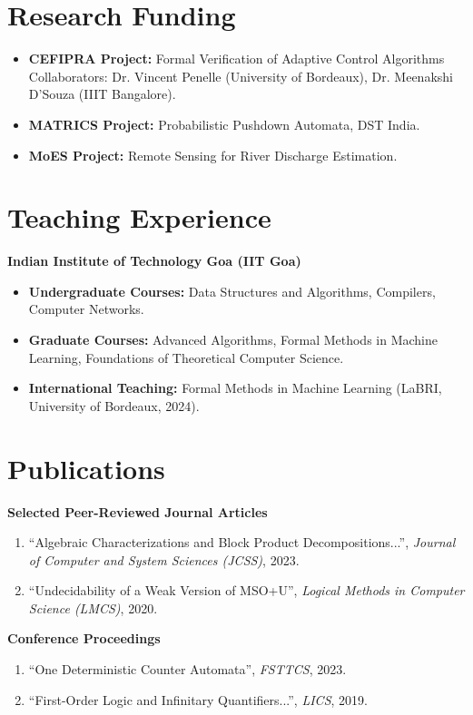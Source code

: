 \documentclass[11pt]{article}
\begin{document}
\section*{Research Funding}
\begin{itemize}
    \item \textbf{CEFIPRA Project:} Formal Verification of Adaptive Control Algorithms \\
    Collaborators: Dr. Vincent Penelle (University of Bordeaux), Dr. Meenakshi D'Souza (IIIT Bangalore).
    \item \textbf{MATRICS Project:} Probabilistic Pushdown Automata, DST India.
    \item \textbf{MoES Project:} Remote Sensing for River Discharge Estimation.
\end{itemize}

\section*{Teaching Experience}
\textbf{Indian Institute of Technology Goa (IIT Goa)} \\
\begin{itemize}
    \item \textbf{Undergraduate Courses:} Data Structures and Algorithms, Compilers, Computer Networks.
    \item \textbf{Graduate Courses:} Advanced Algorithms, Formal Methods in Machine Learning, Foundations of Theoretical Computer Science.
    \item \textbf{International Teaching:} Formal Methods in Machine Learning (LaBRI, University of Bordeaux, 2024).
\end{itemize}

\section*{Publications}
\textbf{Selected Peer-Reviewed Journal Articles}
\begin{enumerate}
    \item ``Algebraic Characterizations and Block Product Decompositions...'', \emph{Journal of Computer and System Sciences (JCSS)}, 2023.
    \item ``Undecidability of a Weak Version of MSO+U'', \emph{Logical Methods in Computer Science (LMCS)}, 2020.
\end{enumerate}

\textbf{Conference Proceedings}
\begin{enumerate}
    \item ``One Deterministic Counter Automata'', \emph{FSTTCS}, 2023.
    \item ``First-Order Logic and Infinitary Quantifiers...'', \emph{LICS}, 2019.
\end{enumerate}
\end{document}
